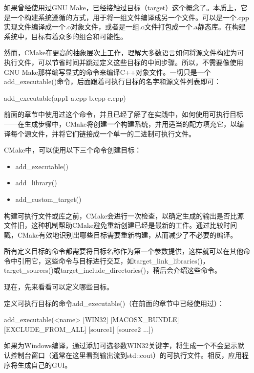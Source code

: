如果曾经使用过GNU Make，已经接触过目标（target）这个概念了。本质上，它是一个构建系统遵循的方式，用于将一组文件编译成另一个文件。可以是一个.cpp实现文件编译成一个.o对象文件，或者是一组.o文件打包成一个.a静态库。在构建系统中，目标有着众多的组合和可能性。

然而，CMake在更高的抽象层次上工作，理解大多数语言如何将源文件构建为可执行文件，可以节省时间并跳过定义这些目标的中间步骤。所以，不需要像使用GNU Make那样编写显式的命令来编译C++对象文件。一切只是一个add\_executable()命令，后面跟着可执行目标的名字和源文件列表即可：

\begin{cmake}
add_executable(app1 a.cpp b.cpp c.cpp)
\end{cmake}

前面的章节中使用过这个命令，并且已经了解了在实践中，如何使用可执行目标——在生成步骤中，CMake将创建一个构建系统，并用适当的配方填充它，以编译每个源文件，并将它们链接成一个单一的二进制可执行文件。

CMake中，可以使用以下三个命令创建目标：

\begin{itemize}
\item
add\_executable()

\item
add\_library()

\item
add\_custom\_target()
\end{itemize}

构建可执行文件或库之前，CMake会进行一次检查，以确定生成的输出是否比源文件旧，这种机制帮助CMake避免重新创建已经是最新的工件。通过比较时间戳，CMake有效地识别出哪些目标需要重新构建，从而减少了不必要的编译。

所有定义目标的命令都需要将目标名称作为第一个参数提供，这样就可以在其他命令中引用它，这些命令与目标进行交互，如target\_link\_libraries()，target\_sources()或target\_include\_directories()，稍后会介绍这些命令。

现在，先来看看可以定义哪些目标。


定义可执行目标的命令add\_executable()（在前面的章节中已经使用过）：

\begin{shell}
add_executable(<name> [WIN32] [MACOSX_BUNDLE]
                [EXCLUDE_FROM_ALL]
                [source1] [source2 ...])
\end{shell}

如果为Windows编译，通过添加可选参数WIN32关键字，将生成一个不会显示默认控制台窗口（通常在这里看到输出流到std::cout）的可执行文件。相反，应用程序将生成自己的GUI。


